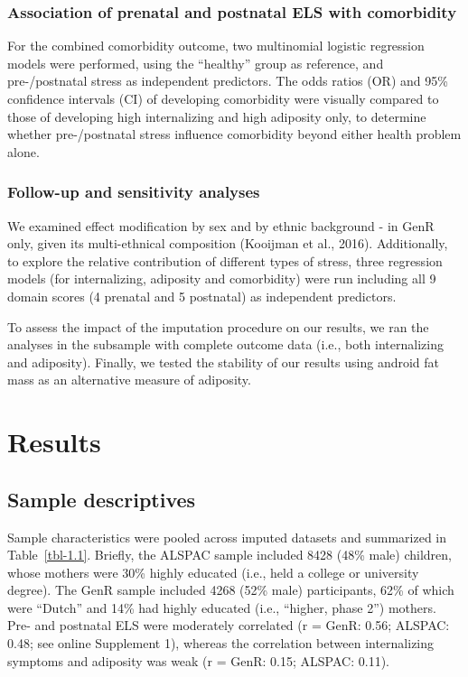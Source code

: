 \documentclass[
  letterpaper,
  DIV=11,
  numbers=noendperiod]{scrreport}
\begin{document}
\subsubsection{Association of prenatal and postnatal ELS with
comorbidity}\label{association-of-prenatal-and-postnatal-els-with-comorbidity}

For the combined comorbidity outcome, two multinomial logistic
regression models were performed, using the ``healthy'' group as
reference, and pre-/postnatal stress as independent predictors. The odds
ratios (OR) and 95\% confidence intervals (CI) of developing comorbidity
were visually compared to those of developing high internalizing and
high adiposity only, to determine whether pre-/postnatal stress
influence comorbidity beyond either health problem alone.

\subsubsection{Follow-up and sensitivity
analyses}\label{follow-up-and-sensitivity-analyses}

We examined effect modification by sex and by ethnic background - in
GenR only, given its multi-ethnical composition (Kooijman et al., 2016).
Additionally, to explore the relative contribution of different types of
stress, three regression models (for internalizing, adiposity and
comorbidity) were run including all 9 domain scores (4 prenatal and 5
postnatal) as independent predictors.

To assess the impact of the imputation procedure on our results, we ran
the analyses in the subsample with complete outcome data (i.e., both
internalizing and adiposity). Finally, we tested the stability of our
results using android fat mass as an alternative measure of adiposity.

\section{Results}\label{results}

\subsection{Sample descriptives}\label{sample-descriptives}

Sample characteristics were pooled across imputed datasets and
summarized in Table~\ref{tbl-1.1}. Briefly, the ALSPAC sample included
8428 (48\% male) children, whose mothers were 30\% highly educated
(i.e., held a college or university degree). The GenR sample included
4268 (52\% male) participants, 62\% of which were ``Dutch'' and 14\% had
highly educated (i.e., ``higher, phase 2'') mothers. Pre- and postnatal
ELS were moderately correlated (r = GenR: 0.56; ALSPAC: 0.48; see online
Supplement 1), whereas the correlation between internalizing symptoms
and adiposity was weak (r = GenR: 0.15; ALSPAC: 0.11).
\end{document}
